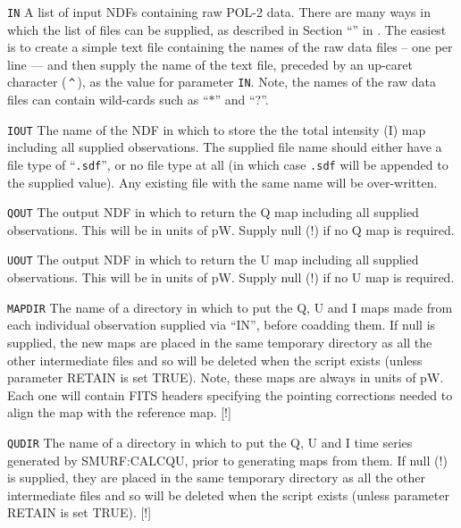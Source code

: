 \begin{aligndesc}
\item[\texttt{IN}] A list of input NDFs containing raw POL-2 data.
There are many ways in which the list of files can be supplied,
as described in Section ``''
in . The easiest is to create a simple text
file containing the names of the raw data files -- one per line --- and
then supply the name of the text file, preceded by an up-caret character
(\,\texttt{\^{}}\,), as the value for parameter \texttt{IN}. Note, the names of
the raw data files can contain wild-cards such as ``$*$'' and ``?''.

\item[\texttt{IOUT}]
The name of the NDF in which to store the the total intensity (I) map
including all supplied observations. The supplied file name should either have a file type of
``\texttt{.sdf}'', or no file type at all (in which case \texttt{.sdf}
will be appended to the supplied value). Any existing file with the same
name will be over-written.

\item[\texttt{QOUT}]
The output NDF in which to return the Q map including all supplied
observations. This will be in units of pW. Supply null (!) if no Q
map is required.


\item[\texttt{UOUT}]
The output NDF in which to return the U map including all supplied
observations. This will be in units of pW. Supply null (!) if no U
map is required.

\item[\texttt{MAPDIR}]
The name of a directory in which to put the Q, U and I maps made
from each individual observation supplied via ``IN'', before
coadding them. If
null is supplied, the new maps are placed in the same temporary
directory as all the other intermediate files and so will be
deleted when the script exists (unless parameter RETAIN is set
TRUE). Note, these maps are always in units of pW. Each one will
contain FITS headers specifying the pointing corrections needed
to align the map with the reference map. [!]


\item[\texttt{QUDIR}]
The name of a directory in which to put the Q, U and I time series
generated by SMURF:CALCQU, prior to generating maps from them. If
null (!) is supplied, they are placed in the same temporary directory
as all the other intermediate files and so will be deleted when the
script exists (unless parameter RETAIN is set TRUE). [!]


\end{aligndesc}

